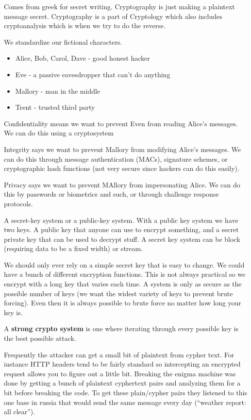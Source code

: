 \documentclass{article}
\begin{document}

Comes from greek for secret writing. Cryptography is just making a plaintext message secret. Cryptography is a part of Cryptology which also includes cryptoanalysis which is when we try to do the reverse.
	

We standardize our fictional characters. 
\begin{itemize}
	\item Alice, Bob, Carol, Dave - good honest hacker
	\item Eve - a passive eavesdropper that can't do anything
	\item Mallory - man in the middle
	\item Trent - trusted third party
\end{itemize}


Confidentiality means we want to prevent Even from reading Alice's messages. We can do this using a cryptosystem

Integrity says we want to prevent Mallory from modifying Alice's messages. We can do this through message authentication (MACs), signature schemes, or cryptographic hash functions (not very secure since hackers can do this easily).

Privacy says we want to prevent MAllory from impersonating Alice. We can do this by passwords or biometrics and such, or through challenge response protocols.

A secret-key system or a public-key system. With a public key system we have two keys. A public key that anyone can use to encrypt something, and a secret private key that can be used to decrypt stuff. A secret key system can be block (requiring data to be a fixed width) or stream.



We should only ever rely on a simple secret key that is easy to change. We could have a bunch of different encryption functions. This is not always practical so we encrypt with a long key that varies each time. A system is only as secure as the possible number of keys (we want the widest variety of keys to prevent brute forcing). Even then it is always possible to brute force no matter how long your key is. 


A \textbf{strong crypto system} is one where iterating through every possible key is the best possible attack. 


Frequently the attacker can get a small bit of plaintext from cypher text. For instance HTTP headers tend to be fairly standard so intercepting an encrypted request allows you to figure out a little bit. Breaking the enigma machine was done by getting a bunch of plaintext cyphertext pairs and analyzing them for a bit before breaking the code. To get these plain/cypher pairs they listened to this one base in russia that would send the same message every day (``weather report: all clear''). 
\end{document}
